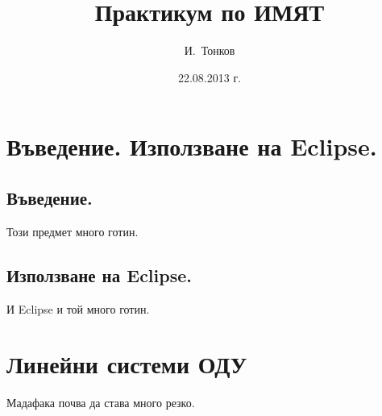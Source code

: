 \documentclass[a4paper,10pt]{report}
\title{Практикум по ИМЯТ}
\author{И.~Тонков}
\date{22.08.2013 г.}
\begin{document}
\maketitle
\tableofcontents
\pagebreak
\chapter{Въведение. Използване на Eclipse.}
\section{Въведение.}
Този предмет много готин.
\section{Използване на Eclipse.}
 И Eclipse и той много готин.
\chapter{Линейни системи ОДУ}
Мадафака почва да става много резко.
\end{document}
